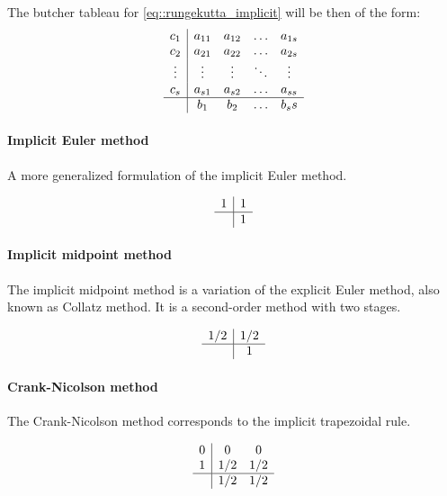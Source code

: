 The butcher tableau for \eqref{eq::rungekutta_implicit} will be then of the form:
\begin{equation}
	\begin{array}
	{c|cccc}
		c_1    & a_{11} & a_{12} & \ldots & a_{1s} \\
		c_2    & a_{21} & a_{22} & \ldots & a_{2s} \\
		\vdots & \vdots & \vdots & \ddots & \vdots \\
		c_s    & a_{s1} & a_{s2} & \ldots & a_{ss} \\ \hline
		       & b_1    & b_2    & \ldots & b_ss
	\end{array}
\end{equation}

\paragraph{Implicit Euler method}
A more generalized formulation of the implicit Euler method.

\begin{equation}
	\begin{array}{c|c}
		1 & 1 \\ \hline
		  & 1  
	\end{array}
	\label{eq::implicit_euler}
\end{equation}

\paragraph{Implicit midpoint method}
The implicit midpoint method is a variation of the explicit Euler method, also known as Collatz method. It is a second-order method with two stages.

\begin{equation}
	\begin{array}{c|c}
		1/2 & 1/2 \\ \hline
		    & 1 
	\end{array}
	\label{eq::implicit_midpoint}
\end{equation}

\paragraph{Crank-Nicolson method}
The Crank-Nicolson method corresponds to the implicit trapezoidal rule.

\begin{equation}
	\begin{array}{c|cc}
		0 & 0   & 0   \\
		1 & 1/2 & 1/2 \\ \hline
		  & 1/2 & 1/2
	\end{array}
	\label{eq::crank-nicolson}
\end{equation}

